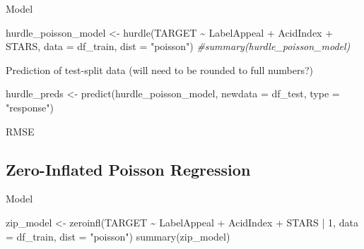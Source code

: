\documentclass[
]{article}
\newenvironment{Shaded}{\begin{snugshade}}{\end{snugshade}}
\newcommand{\AttributeTok}[1]{\textcolor[rgb]{0.77,0.63,0.00}{#1}}
\newcommand{\CommentTok}[1]{\textcolor[rgb]{0.56,0.35,0.01}{\textit{#1}}}
\newcommand{\DecValTok}[1]{\textcolor[rgb]{0.00,0.00,0.81}{#1}}
\newcommand{\FunctionTok}[1]{\textcolor[rgb]{0.00,0.00,0.00}{#1}}
\newcommand{\NormalTok}[1]{#1}
\newcommand{\OtherTok}[1]{\textcolor[rgb]{0.56,0.35,0.01}{#1}}
\newcommand{\SpecialCharTok}[1]{\textcolor[rgb]{0.00,0.00,0.00}{#1}}
\newcommand{\StringTok}[1]{\textcolor[rgb]{0.31,0.60,0.02}{#1}}
\begin{document}
Model

\begin{Shaded}
\begin{Highlighting}[]
\NormalTok{hurdle\_poisson\_model }\OtherTok{\textless{}{-}} \FunctionTok{hurdle}\NormalTok{(TARGET }\SpecialCharTok{\textasciitilde{}}\NormalTok{ LabelAppeal }\SpecialCharTok{+}\NormalTok{ AcidIndex }\SpecialCharTok{+}\NormalTok{ STARS, }\AttributeTok{data =}\NormalTok{ df\_train, }\AttributeTok{dist =} \StringTok{"poisson"}\NormalTok{)}
\CommentTok{\#summary(hurdle\_poisson\_model)}
\end{Highlighting}
\end{Shaded}

Prediction of test-split data (will need to be rounded to full numbers?)

\begin{Shaded}
\begin{Highlighting}[]
\NormalTok{hurdle\_preds }\OtherTok{\textless{}{-}} \FunctionTok{predict}\NormalTok{(hurdle\_poisson\_model, }\AttributeTok{newdata =}\NormalTok{ df\_test, }\AttributeTok{type =} \StringTok{"response"}\NormalTok{)}
\end{Highlighting}
\end{Shaded}

RMSE

\begin{Shaded}
\end{Shaded}

\hypertarget{zero-inflated-poisson-regression}{%
\subsection{Zero-Inflated Poisson
Regression}\label{zero-inflated-poisson-regression}}

Model

\begin{Shaded}
\begin{Highlighting}[]
\NormalTok{zip\_model }\OtherTok{\textless{}{-}} \FunctionTok{zeroinfl}\NormalTok{(TARGET }\SpecialCharTok{\textasciitilde{}}\NormalTok{ LabelAppeal }\SpecialCharTok{+}\NormalTok{ AcidIndex }\SpecialCharTok{+}\NormalTok{ STARS }\SpecialCharTok{|} \DecValTok{1}\NormalTok{, }\AttributeTok{data =}\NormalTok{ df\_train, }\AttributeTok{dist =} \StringTok{"poisson"}\NormalTok{)}
\FunctionTok{summary}\NormalTok{(zip\_model)}
\end{Highlighting}
\end{Shaded}
\end{document}
